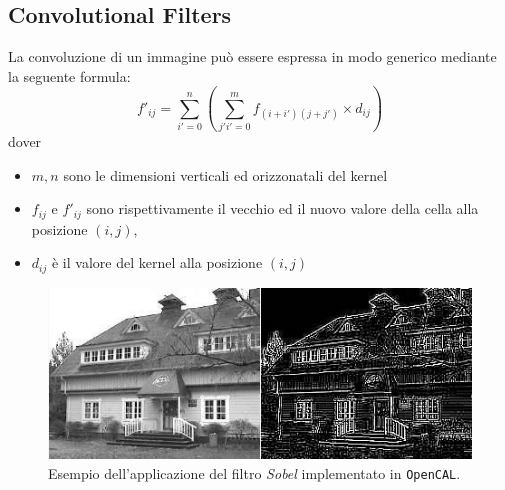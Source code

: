 \subsection{Convolutional Filters}
\label{sec:convolutional_filters}
La convoluzione di un immagine può essere espressa in modo generico mediante la seguente formula:
\begin{equation}
f'_{ij} = \sum_{i'=0}^n (\sum_{j'i'=0}^m f_{(i+i')(j+j')}\times d_{ij})
\label{eq:convolution}
\end{equation}
dover 
\begin{itemize}
	\item $m,n$ sono le dimensioni verticali ed orizzonatali del kernel
	\item $f_{ij}$ e $f'_{ij}$ sono rispettivamente il vecchio ed il nuovo valore della cella alla posizione $(i,j)$,
	\item $d_{ij}$ è il valore del kernel alla posizione $(i,j)$ 
\end{itemize}
\begin{figure}[!htb]
	\includegraphics[width=\linewidth]{./images/sobel_example}
	
	\caption{Esempio dell'applicazione del filtro \textit{Sobel} implementato in \texttt{OpenCAL}. }
	\label{fig:sobel}
\end{figure}

